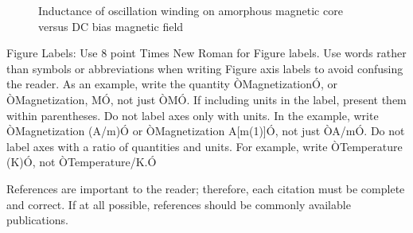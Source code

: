 \documentclass[a4paper, 10pt, conference]{ieeeconf}      %
\begin{document}
\begin{figure}[thpb]
	\centering
	\caption{Inductance of oscillation winding on amorphous
		magnetic core versus DC bias magnetic field}
	\label{figurelabel}
\end{figure}


Figure Labels: Use 8 point Times New Roman for Figure labels. Use words rather than symbols or abbreviations when writing Figure axis labels to avoid confusing the reader. As an example, write the quantity ÒMagnetizationÓ, or ÒMagnetization, MÓ, not just ÒMÓ. If including units in the label, present them within parentheses. Do not label axes only with units. In the example, write ÒMagnetization (A/m)Ó or ÒMagnetization {A[m(1)]}Ó, not just ÒA/mÓ. Do not label axes with a ratio of quantities and units. For example, write ÒTemperature (K)Ó, not ÒTemperature/K.Ó




References are important to the reader; therefore, each citation must be complete and correct. If at all possible, references should be commonly available publications.
\end{document}

